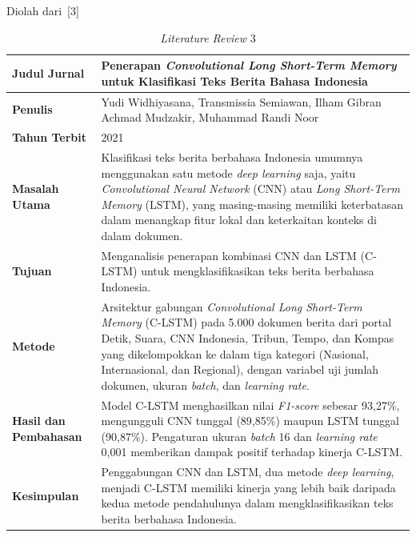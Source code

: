\documentclass[12pt,a4paper,twoside]{report}
\begin{document}
\clearpage
\begin{table}[H]
  \centering
  \caption{\textit{Literature Review} 3}
  \label{tab:sota3}
  \par\nopagebreak\vspace{2pt}Diolah dari~[3]\par\vspace{4pt}
  \begin{spacing}{1.0}
  \normalsize
  \begin{tabular}{|L{119.5pt}|L{251.5pt}|}
    \hline
    \textbf{Judul Jurnal} & \raggedright\arraybackslash Penerapan \textit{Convolutional Long Short-Term Memory} untuk Klasifikasi Teks Berita Bahasa Indonesia \\ \hline
    \textbf{Penulis} & \raggedright\arraybackslash Yudi Widhiyasana, Transmissia Semiawan, Ilham Gibran Achmad Mudzakir, Muhammad Randi Noor \\ \hline
    \textbf{Tahun Terbit} & 2021 \\ \hline
    \textbf{Masalah Utama} & Klasifikasi teks berita berbahasa Indonesia umumnya menggunakan satu metode \textit{deep learning} saja, yaitu \textit{Convolutional Neural Network} (CNN) atau \textit{Long Short-Term Memory} (LSTM), yang masing-masing memiliki keterbatasan dalam menangkap fitur lokal dan keterkaitan konteks di dalam dokumen. \\ \hline
    \textbf{Tujuan} & Menganalisis penerapan kombinasi CNN dan LSTM (C-LSTM) untuk mengklasifikasikan teks berita berbahasa Indonesia. \\ \hline
    \textbf{Metode} & Arsitektur gabungan \textit{Convolutional Long Short-Term Memory} (C-LSTM) pada 5.000 dokumen berita dari portal Detik, Suara, CNN Indonesia, Tribun, Tempo, dan Kompas yang dikelompokkan ke dalam tiga kategori (Nasional, Internasional, dan Regional), dengan variabel uji jumlah dokumen, ukuran \textit{batch}, dan \textit{learning rate}. \\ \hline
    \textbf{Hasil dan Pembahasan} & Model C-LSTM menghasilkan nilai \textit{F1-score} sebesar 93,27\%, mengungguli CNN tunggal (89,85\%) maupun LSTM tunggal (90,87\%). Pengaturan ukuran \textit{batch} 16 dan \textit{learning rate} 0,001 memberikan dampak positif terhadap kinerja C-LSTM. \\ \hline
    \textbf{Kesimpulan} & Penggabungan CNN dan LSTM, dua metode \textit{deep learning}, menjadi C-LSTM memiliki kinerja yang lebih baik daripada kedua metode pendahulunya dalam mengklasifikasikan teks berita berbahasa Indonesia. \\ \hline
  \end{tabular}
  \end{spacing}
\end{table}
\end{document}
